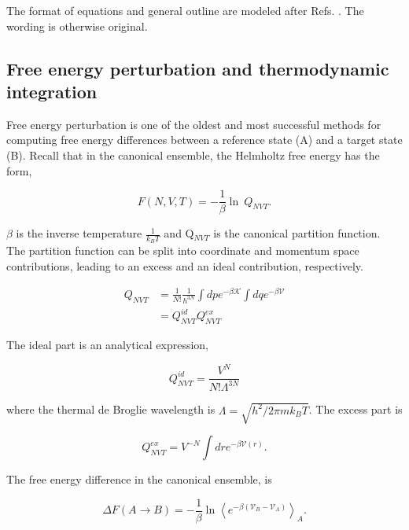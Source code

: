 \begin{theory}
 The format of equations and general outline are modeled after Refs. \cite{smit,tlbbook}. The wording is otherwise original.
 
 \subsection{\label{ch2:sec4:level2}Free energy perturbation and thermodynamic integration}
 Free energy perturbation is one of the oldest and most successful methods for computing free energy differences between a
 reference state (A) and a target state (B). Recall that in the canonical ensemble, the Helmholtz free energy has the form,
 
 \begin{equation}\label{helmholtz}
     F(N,V,T) = -\frac{1}{\beta}\ln~Q_{NVT}.
 \end{equation}
 
 \noindent $\beta$ is the inverse temperature $\frac{1}{k_{B}T}$ and Q$_{NVT}$ is the canonical partition function. The partition 
 function can be split into coordinate and momentum space contributions, leading to an excess and an ideal contribution, 
 respectively.
 
 \begin{equation}\label{q_nvt}
  \begin{split}
      Q_{NVT} &= \frac{1}{N!}\frac{1}{h^{3N}}\int dp e^{-\beta\mathcal{K}} \int dq e^{-\beta\mathcal{V}} \\
              &= Q^{id}_{NVT}Q^{ex}_{NVT}
  \end{split}
 \end{equation}
 
 \noindent The ideal part is an analytical expression,
 
 \begin{equation}\label{q_id}
     Q^{id}_{NVT} = \frac{V^N}{N!\Lambda^{3N}}
 \end{equation}
 
 \noindent where the thermal de Broglie wavelength is $\Lambda = \sqrt{h^2/2\pi mk_{B}T}$. The excess part is
 
 \begin{equation}\label{q_ex}
     Q^{ex}_{NVT} = V^{-N}\int dr e^{-\beta\mathcal{V}(r)}.
 \end{equation}
 
 The free energy difference in the canonical ensemble, is
 
 \begin{equation}\label{fep}
     \Delta F(A\rightarrow B) = -\frac{1}{\beta}\ln\left<e^{-\beta\left(\mathcal{V}_{B}-\mathcal{V}_{A}\right)}\right>_{A}.
 \end{equation}
 

\end{theory}
